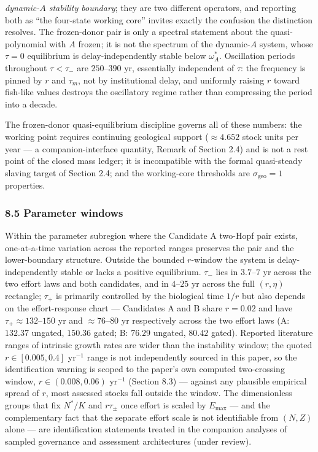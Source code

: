 \documentclass[11pt]{article}
\begin{document}
\emph{dynamic-\(A\) stability boundary}; they are two different
operators, and reporting both as ``the four-state working core'' invites
exactly the confusion the distinction resolves. The frozen-donor pair is
only a spectral statement about the quasi-polynomial with \(A\) frozen;
it is not the spectrum of the dynamic-\(A\) system, whose \(\tau = 0\)
equilibrium is delay-independently stable below \(\omega_A^*\).
Oscillation periods throughout \(\tau < \tau_-\) are \(250\)--\(390\)
yr, essentially independent of \(\tau\): the frequency is pinned by
\(r\) and \(\tau_m\), not by institutional delay, and uniformly raising
\(r\) toward fish-like values destroys the oscillatory regime rather
than compressing the period into a decade.

The frozen-donor quasi-equilibrium discipline governs all of these
numbers: the working point requires continuing geological support
(\(\approx4.652\) stock units per year --- a companion-interface
quantity, Remark of Section 2.4) and is not a rest point of the closed
mass ledger; it is incompatible with the formal quasi-steady slaving
target of Section 2.4; and the working-core thresholds are
\(\sigma_{\mathrm{geo}} = 1\) properties.

\subsubsection{8.5 Parameter windows}\label{parameter-windows}

Within the parameter subregion where the Candidate A two-Hopf pair
exists, one-at-a-time variation across the reported ranges preserves the
pair and the lower-boundary structure. Outside the bounded \(r\)-window
the system is delay-independently stable or lacks a positive
equilibrium. \(\tau_-\) lies in \(3.7\)--\(7\) yr across the two effort
laws and both candidates, and in \(4\)--\(25\) yr across the full
\((r, \eta)\) rectangle; \(\tau_+\) is primarily controlled by the
biological time \(1/r\) but also depends on the effort-response chart
--- Candidates A and B share \(r = 0.02\) and have
\(\tau_+ \approx 132\)--\(150\) yr and \(\approx76\)--\(80\) yr
respectively across the two effort laws (A: \(132.37\) ungated,
\(150.36\) gated; B: \(76.29\) ungated, \(80.42\) gated). Reported
literature ranges of intrinsic growth rates are wider than the
instability window; the quoted \(r \in [0.005, 0.4]\) yr\(^{-1}\) range
is not independently sourced in this paper, so the identification
warning is scoped to the paper's own computed two-crossing window,
\(r \in (0.008, 0.06)\) yr\(^{-1}\) (Section 8.3) --- against any
plausible empirical spread of \(r\), most assessed stocks fall outside
the window. The dimensionless groups that fix \(N^*/K\) and
\(r\tau_\pm\) once effort is scaled by \(E_{\max}\) --- and the
complementary fact that the separate effort scale is not identifiable
from \((N, Z)\) alone --- are identification statements treated in the
companion analyses of sampled governance and assessment architectures
(under review).
\end{document}
